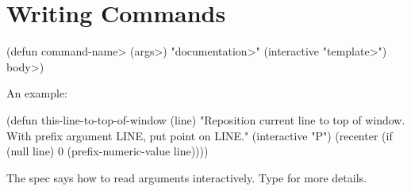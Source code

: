\section{Writing Commands}

\beginexample%
(defun \<command-name> (\<args>)
  "\<documentation>" (interactive "\<template>")
  \<body>)
\endexample

An example:

\beginexample%
(defun this-line-to-top-of-window (line)
  "Reposition current line to top of window.
With prefix argument LINE, put point on LINE."
  (interactive "P")
  (recenter (if (null line)
                0
              (prefix-numeric-value line))))
\endexample

The  spec says how to read arguments interactively.
Type  for more details.

\copyrightnotice

\bye

